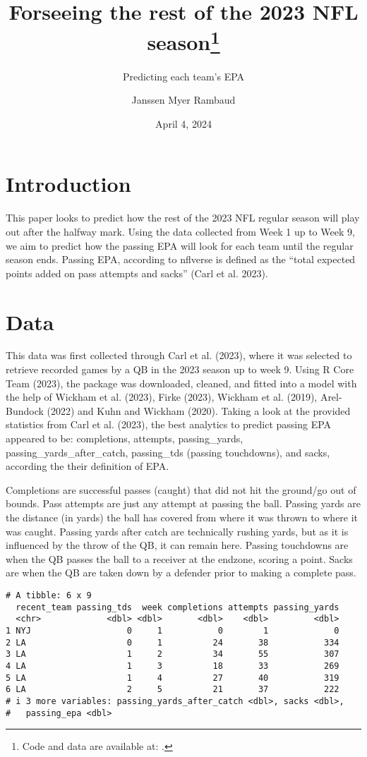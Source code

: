\documentclass[
  letterpaper,
  DIV=11,
  numbers=noendperiod]{scrartcl}
\title{Forseeing the rest of the 2023 NFL season\thanks{Code and data
are available at: .}}
\subtitle{Predicting each team's EPA}
\author{Janssen Myer Rambaud}
\date{April 4, 2024}
\begin{document}
\maketitle

\section{Introduction}\label{introduction}

This paper looks to predict how the rest of the 2023 NFL regular season
will play out after the halfway mark. Using the data collected from Week
1 up to Week 9, we aim to predict how the passing EPA will look for each
team until the regular season ends. Passing EPA, according to nflverse
is defined as the ``total expected points added on pass attempts and
sacks'' (Carl et al. 2023).

\section{Data}\label{sec-data}

This data was first collected through Carl et al. (2023), where it was
selected to retrieve recorded games by a QB in the 2023 season up to
week 9. Using R Core Team (2023), the package was downloaded, cleaned,
and fitted into a model with the help of Wickham et al. (2023), Firke
(2023), Wickham et al. (2019), Arel-Bundock (2022) and Kuhn and Wickham
(2020). Taking a look at the provided statistics from Carl et al.
(2023), the best analytics to predict passing EPA appeared to be:
completions, attempts, passing\_yards, passing\_yards\_after\_catch,
passing\_tds (passing touchdowns), and sacks, according the their
definition of EPA.

Completions are successful passes (caught) that did not hit the
ground/go out of bounds. Pass attempts are just any attempt at passing
the ball. Passing yards are the distance (in yards) the ball has covered
from where it was thrown to where it was caught. Passing yards after
catch are technically rushing yards, but as it is influenced by the
throw of the QB, it can remain here. Passing touchdowns are when the QB
passes the ball to a receiver at the endzone, scoring a point. Sacks are
when the QB are taken down by a defender prior to making a complete
pass.

\begin{verbatim}
# A tibble: 6 x 9
  recent_team passing_tds  week completions attempts passing_yards
  <chr>             <dbl> <dbl>       <dbl>    <dbl>         <dbl>
1 NYJ                   0     1           0        1             0
2 LA                    0     1          24       38           334
3 LA                    1     2          34       55           307
4 LA                    1     3          18       33           269
5 LA                    1     4          27       40           319
6 LA                    2     5          21       37           222
# i 3 more variables: passing_yards_after_catch <dbl>, sacks <dbl>,
#   passing_epa <dbl>
\end{verbatim}
\end{document}
